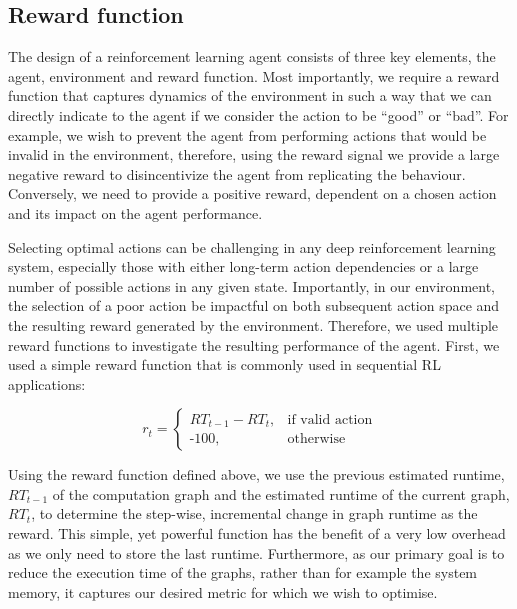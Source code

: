 
\subsection{Reward function}
\label{sec:prob:subsec:rwd}
The design of a reinforcement learning agent consists of three key elements, the agent, environment and reward function. Most importantly, we require a reward function that captures dynamics of the environment in such a way that we can directly indicate to the agent if we consider the action to be ``good'' or ``bad''. For example, we wish to prevent the agent from performing actions that would be invalid in the environment, therefore, using the reward signal we provide a large negative reward to disincentivize the agent from replicating the behaviour. Conversely, we need to provide a positive reward, dependent on a chosen action and its impact on the agent performance.

Selecting optimal actions can be challenging in any deep reinforcement learning system, especially those with either long-term action dependencies or a large number of possible actions in any given state. Importantly, in our environment, the selection of a poor action be impactful on both subsequent action space and the resulting reward generated by the environment. Therefore, we used multiple reward functions to investigate the resulting performance of the agent. First, we used a simple reward function that is commonly used in sequential RL applications:

$$
r_t =
\begin{cases}
  RT_{t-1} - RT_t, & \text{if valid action}\\
  \text{-}100,            & \text{otherwise}
\end{cases}
$$

Using the reward function defined above, we use the previous estimated runtime, $RT_{t-1}$ of the computation graph and the estimated runtime of the current graph, $RT_t$, to determine the step-wise, incremental change in graph runtime as the reward. This simple, yet powerful function has the benefit of a very low overhead as we only need to store the last runtime. Furthermore, as our primary goal is to reduce the execution time of the graphs, rather than for example the system memory, it captures our desired metric for which we wish to optimise.

